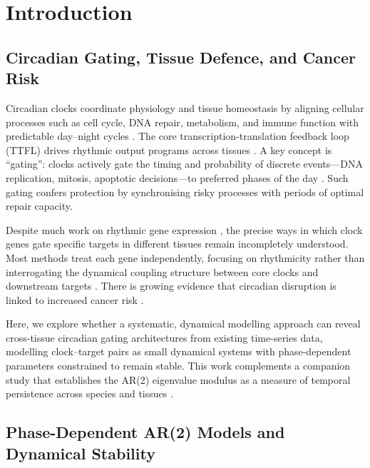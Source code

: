 \documentclass[11pt,letterpaper]{article}
\begin{document}
\tableofcontents

\newpage

\section{Introduction}

\subsection{Circadian Gating, Tissue Defence, and Cancer Risk}

Circadian clocks coordinate physiology and tissue homeostasis by aligning cellular processes such as cell cycle, DNA repair, metabolism, and immune function with predictable day--night cycles \citep{bass2010circadian, takahashi2017transcriptional, reppert2002coordination}. The core transcription-translation feedback loop (TTFL) drives rhythmic output programs across tissues \citep{panda2002coordinated, storch2002extensive, ko2006molecular}. A key concept is ``gating'': clocks actively gate the timing and probability of discrete events---DNA replication, mitosis, apoptotic decisions---to preferred phases of the day \citep{matsuo2003control}. Such gating confers protection by synchronising risky processes with periods of optimal repair capacity.

Despite much work on rhythmic gene expression \citep{ueda2002system, zhang2014circadian}, the precise ways in which clock genes gate specific targets in different tissues remain incompletely understood. Most methods treat each gene independently, focusing on rhythmicity rather than interrogating the dynamical coupling structure between core clocks and downstream targets \citep{hughes2017guidelines, hughes2010jtk, cornelissen2014cosinor}. There is growing evidence that circadian disruption is linked to increased cancer risk \citep{gery2007circadian, hansen2017night, masri2018emerging, sancar2021clocks, fu2003circadian}.

Here, we explore whether a systematic, dynamical modelling approach can reveal cross-tissue circadian gating architectures from existing time-series data, modelling clock--target pairs as small dynamical systems with phase-dependent parameters constrained to remain stable. This work complements a companion study that establishes the AR(2) eigenvalue modulus as a measure of temporal persistence across species and tissues \citep{whiteside2026paper_a}.

\subsection{Phase-Dependent AR(2) Models and Dynamical Stability}
\end{document}
